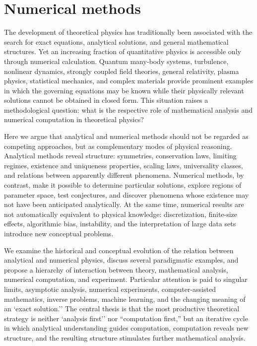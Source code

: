 \chapter{Numerical methods}
\label{nm}

The development of theoretical physics has traditionally been associated with
the search for exact equations, analytical solutions, and general mathematical
structures. Yet an increasing fraction of quantitative physics is accessible
only through numerical calculation. Quantum many-body systems, turbulence,
nonlinear dynamics, strongly coupled field theories, general relativity, plasma
physics, statistical mechanics, and complex materials provide prominent
examples in which the governing equations may be known while their physically
relevant solutions cannot be obtained in closed form. This situation raises a
methodological question: what is the respective role of mathematical analysis
and numerical computation in theoretical physics?

Here we argue that analytical and numerical methods should not be regarded
as competing approaches, but as complementary modes of physical reasoning.
Analytical methods reveal structure: symmetries, conservation laws, limiting
regimes, existence and uniqueness properties, scaling laws, universality
classes, and relations between apparently different phenomena. Numerical
methods, by contrast, make it possible to determine particular solutions,
explore regions of parameter space, test conjectures, and discover phenomena
whose existence may not have been anticipated analytically. At the same time,
numerical results are not automatically equivalent to physical knowledge:
discretization, finite-size effects, algorithmic bias, instability, and the
interpretation of large data sets introduce new conceptual problems.

We examine the historical and conceptual evolution of the relation between
analytical and numerical physics, discuss several paradigmatic examples, and
propose a hierarchy of interaction between theory, mathematical analysis,
numerical computation, and experiment. Particular attention is paid to singular
limits, asymptotic analysis, numerical experiments, computer-assisted
mathematics, inverse problems, machine learning, and the changing meaning of an
`exact solution.'' The central thesis is that the most productive theoretical
strategy is neither `analysis first'' nor ``computation first,'' but an
iterative cycle in which analytical understanding guides computation,
computation reveals new structure, and the resulting structure stimulates
further mathematical analysis.

